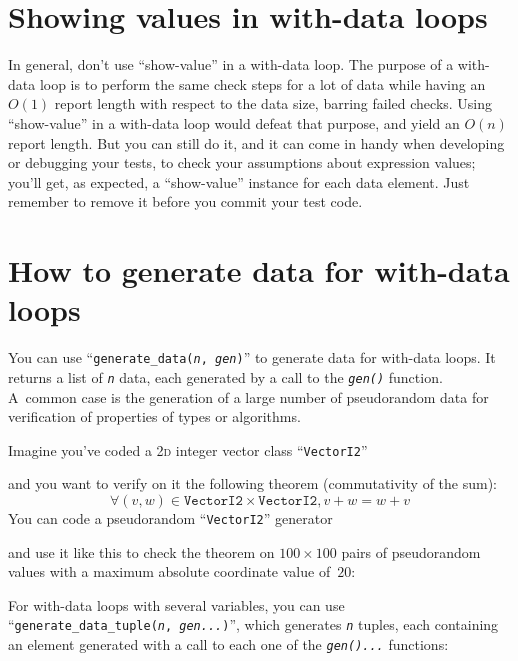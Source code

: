 \documentclass[twoside, a4paper, article]{memoir}
\newcommand\typesetexample[1]{%
  \typesetexamplesource{#1}
}
\newcommand\typesetexampleandreport[1]{%
  \typesetexamplesource{#1}
  \typesetexamplereport{#1}
}
\providecommand\typesetexamplereport[1]{%
}
\providecommand\typesetexamplesource[1]{%
}
\begin{document}
\typesetexampleandreport{with-multiline-data}

\section{Showing values in with-data loops}
\label{sec:showing-values-with-data-loops}

In general, don't use ``show-value'' in a with-data loop.  The purpose of a
with-data loop is to perform the same check steps for a lot of data while
having an $O(1)$ report length with respect to the data size, barring failed
checks.  Using ``show-value'' in a with-data loop would defeat that purpose,
and yield an $O(n)$ report length.  But you can still do it, and it can come in
handy when developing or debugging your tests, to check your assumptions about
expression values; you'll get, as expected, a ``show-value'' instance for each
data element.  Just remember to remove it before you commit your test code.


\section{How to generate data for with-data loops}
\label{sec:generate-data-with-data-loops}

You can use ``\texttt{generate\_data(\textit{n}, \textit{gen})}'' to generate
data for with-data loops.  It returns a list of \texttt{\textit{n}} data, each
generated by a call to the \texttt{\textit{gen()}} function.  A~common case is
the generation of a large number of pseudorandom data for verification of
properties of types or algorithms.

Imagine you've coded a \textsc{2d} integer vector class ``\texttt{VectorI2}''
\typesetexample{data-for-with-data-vector}
and you want to verify on it the following theorem (commutativity of the sum):
\begin{equation}
  \label{eq:1}
  \forall (v, w) \in \texttt{VectorI2} \times \texttt{VectorI2}, v + w = w + v
\end{equation}
You can code a pseudorandom ``\texttt{VectorI2}'' generator
\typesetexample{data-for-with-data-generator}
and use it like this to check the theorem on $100 \times 100$ pairs of
pseudorandom values with a maximum absolute coordinate value of~$20$:

\typesetexampleandreport{data-for-with-data-loop}

For with-data loops with several variables, you can use
``\texttt{generate\_data\_tuple(\textit{n}, \textit{gen...})}'', which
generates \texttt{\textit{n}} tuples, each containing an element generated with
a call to each one of the \texttt{\textit{gen()...}} functions:
\end{document}
